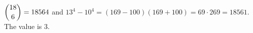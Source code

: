 $\dbinom{18}6=18564$ and $13^4-10^4=(169-100)(169+100)=69\cdot269=18561$. The value is $\boxed{3}$.
